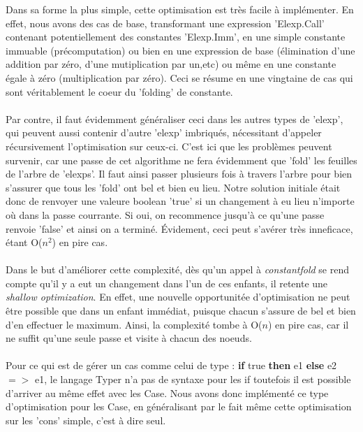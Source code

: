 \documentclass{article}
\begin{document}
Dans sa forme la plus simple, cette optimisation est très facile à implémenter.
En effet, nous avons des cas de base, transformant une expression 'Elexp.Call'
contenant potentiellement des constantes 'Elexp.Imm', en une simple constante
immuable (précomputation) ou bien en une expression de base (élimination d'une
addition par zéro, d'une mutiplication par un,etc) ou même en une constante
égale à zéro (multiplication par zéro). Ceci se résume en une
vingtaine de cas qui sont véritablement le coeur du 'folding' de constante.

\paragraph{}
Par contre, il faut évidemment généraliser ceci dans les autres types de
'elexp', qui peuvent aussi contenir d'autre 'elexp' imbriqués, nécessitant
d'appeler récursivement l'optimisation sur ceux-ci. C'est ici que les problèmes
peuvent survenir, car une passe de cet algorithme ne fera évidemment que 'fold'
les feuilles de l'arbre de 'elexps'. Il faut ainsi passer plusieurs fois à
travers l'arbre pour bien s'assurer que tous les 'fold' ont bel et bien eu
lieu. Notre solution initiale était donc de renvoyer une valeure boolean 'true'
si un changement à eu lieu n'importe où dans la passe courrante. Si oui, on
recommence jusqu'à ce qu'une passe renvoie 'false' et ainsi on a terminé.
Évidement, ceci peut s'avérer très inneficace, étant O($n^2$) en pire cas.

\paragraph{}
Dans le but d'améliorer cette complexité, dès qu'un appel à \emph{constantfold}
se rend compte qu'il y a eut un changement dans l'un de ces enfants, il retente
une \emph{shallow optimization}. En effet, une nouvelle opportunitée
d'optimisation ne peut être possible que dans un enfant immédiat, puisque chacun
s'assure de bel et bien d'en effectuer le maximum. Ainsi, la complexité tombe à
O($n$) en pire cas, car il ne suffit qu'une seule passe et visite à chacun des
noeuds.

\paragraph{}
Pour ce qui est de gérer un cas comme celui de type : \textbf{if} true
\textbf{then} e1 \textbf{else} e2 $=>$ e1, le langage Typer n'a pas de
syntaxe pour les if toutefois il est possible d'arriver au même effet
avec les Case. Nous avons donc implémenté ce type d'optimisation pour les Case,
en généralisant par le fait même cette optimisation sur les 'cons' simple,
c'est à dire seul.
\end{document}
